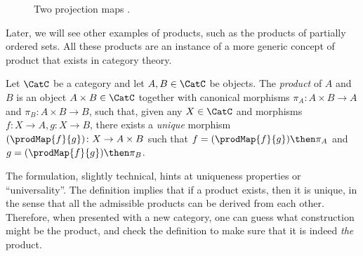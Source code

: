 \begin{figure}[h!]
    \centering
    \caption{Two projection maps \label{fig:resource-product}.}
\end{figure}


Later, we will see other examples of products, such as the products of partially ordered sets.
All these products are an instance of a more generic concept of product that exists in category
theory.
 
\begin{shaded}
\begin{definition}
Let $\CatC$ be a category and let $A,B\in \CatC$ be objects. The \emph{product} of $A$ and $B$ is an object $A \times B \in \CatC$ together with canonical morphisms $\pi_A \colon A \times B \to A$ and $\pi_B \colon A \times B \to B$, such that, given any $X \in \CatC$ and morphisms $f \colon X \to A, g \colon X \to B$, there exists a \emph{unique} morphism $(\prodMap{f}{g}) \colon X \to A \times B$ such that $f = (\prodMap{f}{g})\then \pi_A$ and $g=(\prodMap{f}{g})\then \pi_B$.
\end{definition}
\end{shaded}

The formulation, slightly technical, hints at uniqueness properties or ``universality''.
The definition implies that if a product exists, then it is unique, in the sense
that all the admissible products can be derived from each other. Therefore, when
presented with a new category, one can guess what construction might be the product, and check
the definition to make sure that it is indeed \emph{the} product.


